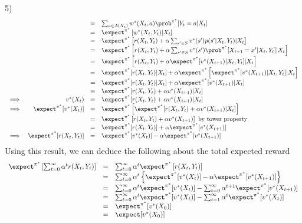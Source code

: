 \documentclass[11pt,a4paper]{article}
\begin{document}
\begin{answer}{5)}
\[\begin{array}{rrcl}
    &&=&\sum_{a\in A(X_t)}w^*(X_t,a)\prob^{\pi^*}[Y_t=a|X_t]\\
    &&=&\expect^{\pi^*}\left[w^*(X_t,Y_t)|X_t\right]\\
    &&=&\expect^{\pi^*}\left[r(X_t,Y_t)+\alpha\sum_{s'\in S}v^*(s')p(s'|X_t,Y_t)|X_t\right]\\
    &&=&\expect^{\pi^*}\left[r(X_t,Y_t)+\alpha\sum_{s'\in S}v^*(s')\prob^{\pi^*}[X_{t+1}=x'|X_t,Y_t]|X_t\right]\\
    &&=&\expect^{\pi^*}\left[r(X_t,Y_t)+\alpha\expect^{\pi^*}[v^*(X_{t+1})|X_t,Y_t]|X_t\right]\\
    &&=&\expect^{\pi^*}[r(X_t,Y_t)|X_t]+\alpha\expect^{\pi^*}\left[\expect^{\pi^*}[v^*(X_{t+1})|X_t,Y_t]|X_t\right]\\
    &&=&\expect^{\pi^*}[r(X_t,Y_t)|X_t]+\alpha\expect^{\pi^*}[v^*(X_{t+1})|X_t]\\
    &&=&\expect^{\pi^*}[r(X_t,Y_t)+\alpha v^*(X_{t+1})|X_t]\\
    \implies&v^*(X_t)&=&\expect^{\pi^*}[r(X_t,Y_t)+\alpha v^*(X_{t+1})|X_t]\\
    \implies&\expect^{\pi^*}[v^*(X_t)]&=&\expect^{\pi^*}\left[\expect^{\pi^*}[r(X_t,Y_t)+\alpha v^*(X_{t+1})|X_t]\right]\\
    &&=&\expect^{\pi^*}\left[r(X_t,Y_t)+\alpha v^*(X_{t+1})\right]\text{ by tower property}\\
    &&=&\expect^{\pi^*}[r(X_t,Y_t)]+\alpha\expect^{\pi^*}[ v^*(X_{t+1})]\\
    \implies&\expect^{\pi^*}[r(X_t,Y_t)]&=&\expect^{\pi^*}[v^*(X_t)]-\alpha\expect^{\pi^*}[v^*(X_{t+1})]
  \end{array}\]
  Using this result, we can deduce the following about the total expected reward
  \[\begin{array}{rcl}
    \expect^{\pi^*}\left[\sum_{t=0}^\infty\alpha^tr(X_t,Y_t)\right]&=&\sum_{t=0}^\infty\alpha^t\expect^{\pi^*}\left[r(X_t,Y_t)\right]\\
    &=&\sum_{t=0}^\infty\alpha^t\left\{\expect^{\pi^*}[v^*(X_t)]-\alpha\expect^{\pi^*}[v^*(X_{t+1})]\right\}\\
    &=&\sum_{t=0}^\infty\alpha^t\expect^{\pi^*}[v^*(X_t)]-\sum_{t=0}^\infty\alpha^{t+1}\expect^{\pi^*}[v^*(X_{t+1})]\\
    &=&\sum_{t=0}^\infty\alpha^t\expect^{\pi^*}[v^*(X_t)]-\sum_{t=1}^\infty\alpha^t\expect^{\pi^*}[v^*(X_t)]\\
    &=&\expect^{\pi^*}[v^*(X_0)]\\
    &=&\expect[v^*(X_0)]
  \end{array}\]
  \proved
\end{answer}
\end{document}
